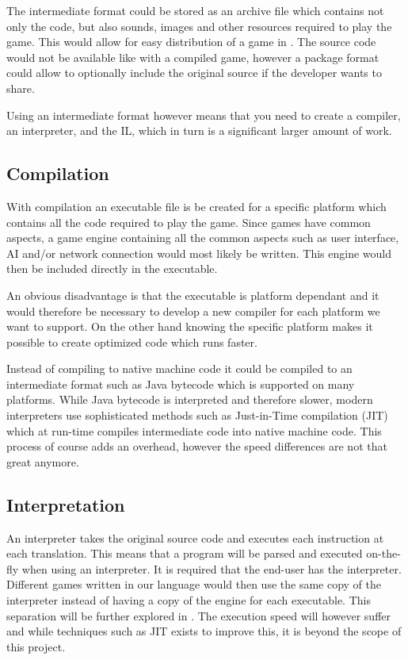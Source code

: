 The intermediate format could be stored as an archive file which contains not
only the code, but also sounds, images and other resources required to play the
game. This would allow for easy distribution of a game in \productname{}. The
source code would not be available like with a compiled game, however a package
format could allow to optionally include the original source if the developer
wants to share.

Using an intermediate format however means that you need to create a compiler,
an interpreter, and the IL, which in turn is a significant
larger amount of work.

\subsection{Compilation}
With compilation an executable file is be created for a specific platform which
contains all the code required to play the game. Since games have common
aspects, a game engine containing all the common aspects such as user interface,
AI and/or network connection would most likely be written. This engine would
then be included directly in the executable.

An obvious disadvantage is that the executable is platform dependant and it
would therefore be necessary to develop a new compiler for each platform we want
to support. On the other hand knowing the specific platform makes it possible to
create optimized code which runs faster.

Instead of compiling to native machine code it could be compiled to an
intermediate format such as Java bytecode which is supported on many platforms.
While Java bytecode is interpreted and therefore slower, modern interpreters
use sophisticated methods such as Just-in-Time compilation (JIT) which at
run-time compiles intermediate code into native machine code. This process of
course adds an overhead, however the speed differences are not that great
anymore.
\cite{java-speed}

\subsection{Interpretation}
An interpreter takes the original source code and executes each instruction at
each translation. This means that a program will be parsed and executed
on-the-fly when using an interpreter. It is required that the end-user has the
interpreter. Different games written in our language would then use the same
copy of the interpreter instead of having a copy of the engine for each
executable. This separation will be further explored in
. The execution speed will however suffer and
while techniques such as JIT exists to improve this, it is beyond the scope of
this project.

